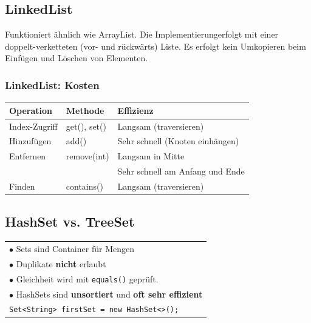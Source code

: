 {\subsection{LinkedList}
    Funktioniert ähnlich wie ArrayList. Die Implementierungerfolgt mit einer doppelt-verketteten (vor- und rückwärts) Liste.
    Es erfolgt kein Umkopieren beim Einfügen und Löschen von Elementen.
    \vspace{-0.1cm}

    \subsubsection{LinkedList: Kosten}
        {\small
        \begin{tabular}{l l l} \hline
            \textbf{Operation} & \textbf{Methode} & \textbf{Effizienz} \\ \hline
            Index-Zugriff & get(), set() & \color{red} Langsam (traversieren) \\
            Hinzufügen    & add()        & \color{green!80!black}Sehr schnell (Knoten einhängen)\\
            Entfernen     & remove(int)  & \color{red}Langsam in Mitte \\
                          &              & \color{green!80!black}Sehr schnell am Anfang und Ende \\
            Finden        & contains()   & \color{red}Langsam (traversieren) \\
        \end{tabular}}
        \vspace{-0.1cm}

\subsection{HashSet vs. TreeSet}
    \begin{tabular}{l}
        $\bullet$ Sets sind Container für Mengen\\
        $\bullet$ Duplikate \textbf{nicht} erlaubt\\
        $\bullet$ Gleichheit wird mit \verb|equals()| geprüft.\\
        $\bullet$ HashSets sind \textbf{unsortiert} und \textbf{oft sehr effizient}\\
        \verb|Set<String> firstSet = new HashSet<>();|\\
    \end{tabular}

}
